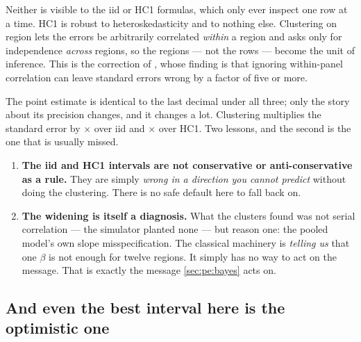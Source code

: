 Neither is visible to the iid or HC1 formulas, which only ever inspect one row at a time. HC1
\citep{white1980, mackinnon1985} is robust to heteroskedasticity and to nothing else. Clustering on
region \citep{liang1986} lets the errors be arbitrarily correlated \emph{within} a region and asks
only for independence \emph{across} regions, so the \nbThreeNClusters{} regions --- not the
\nbThreeNObs{} rows --- become the unit of inference. This is the correction of
\citet{bertrand2004}, whose finding is that ignoring within-panel correlation can leave standard
errors wrong by a factor of five or more.

The point estimate is identical to the last decimal under all three; only the story about its
precision changes, and it changes a lot. Clustering multiplies the standard error by
\nbThreeSeRatioIid$\times$ over iid and \nbThreeSeRatioHc$\times$ over HC1. Two lessons, and the
second is the one that is usually missed.

\begin{enumerate}[leftmargin=*]
  \item \textbf{The iid and HC1 intervals are not conservative or anti-conservative as a rule.}
        They are simply \emph{wrong in a direction you cannot predict} without doing the
        clustering. There is no safe default here to fall back on.
  \item \textbf{The widening is itself a diagnosis.} What the clusters found was not serial
        correlation --- the simulator planted none --- but reason one: the pooled model's own slope
        misspecification. The classical machinery is \emph{telling us} that one $\beta$ is not
        enough for twelve regions. It simply has no way to act on the message. That is exactly the
        message \cref{sec:pe:bayes} acts on.
\end{enumerate}

\subsection*{And even the best interval here is the optimistic one}

